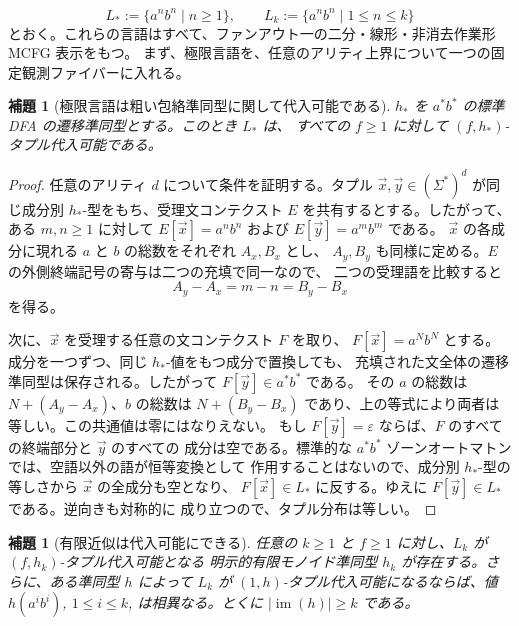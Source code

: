 \documentclass[11pt,a4paper]{ltjsarticle}
\newtheorem{lemma}[theorem]{補題}
\theoremstyle{remark}
\newcommand{\tuple}[1]{\vec{#1}}
\newcommand{\eps}{\varepsilon}
\begin{document}
\[
  L_*:=\{a^n b^n\mid n\ge1\},
  \qquad
  L_k:=\{a^n b^n\mid 1\le n\le k\}
\]
とおく。これらの言語はすべて、ファンアウト一の二分・線形・非消去作業形 MCFG 表示をもつ。
まず、極限言語を、任意のアリティ上界について一つの固定観測ファイバーに入れる。

\begin{lemma}[極限言語は粗い包絡準同型に関して代入可能である]
\label{lem:limit-ab-substitutable}
\(h_*\) を \(a^*b^*\) の標準 DFA の遷移準同型とする。このとき \(L_*\) は、
すべての \(f\ge1\) に対して \((f,h_*)\)-タプル代入可能である。
\end{lemma}

\begin{proof}
任意のアリティ \(d\) について条件を証明する。タプル
\(\tuple x,\tuple y\in(\Sigma^*)^d\) が同じ成分別 \(h_*\)-型をもち、受理文コンテクスト
\(E\) を共有するとする。したがって、ある \(m,n\ge1\) に対して
\(E[\tuple x]=a^n b^n\) および \(E[\tuple y]=a^m b^m\) である。
\(\tuple x\) の各成分に現れる \(a\) と \(b\) の総数をそれぞれ \(A_x,B_x\) とし、
\(A_y,B_y\) も同様に定める。\(E\) の外側終端記号の寄与は二つの充填で同一なので、
二つの受理語を比較すると
\[
  A_y-A_x=m-n=B_y-B_x
\]
を得る。

次に、\(\tuple x\) を受理する任意の文コンテクスト \(F\) を取り、
\(F[\tuple x]=a^N b^N\) とする。成分を一つずつ、同じ \(h_*\)-値をもつ成分で置換しても、
充填された文全体の遷移準同型は保存される。したがって \(F[\tuple y]\in a^*b^*\) である。
その \(a\) の総数は \(N+(A_y-A_x)\)、\(b\) の総数は
\(N+(B_y-B_x)\) であり、上の等式により両者は等しい。この共通値は零にはなりえない。
もし \(F[\tuple y]=\eps\) ならば、\(F\) のすべての終端部分と \(\tuple y\) のすべての
成分は空である。標準的な \(a^*b^*\) ゾーンオートマトンでは、空語以外の語が恒等変換として
作用することはないので、成分別 \(h_*\)-型の等しさから \(\tuple x\) の全成分も空となり、
\(F[\tuple x]\in L_*\) に反する。ゆえに \(F[\tuple y]\in L_*\) である。逆向きも対称的に
成り立つので、タプル分布は等しい。
\end{proof}

\begin{lemma}[有限近似は代入可能にできる]
\label{lem:finite-approximants-substitutable}
任意の \(k\ge1\) と \(f\ge1\) に対し、\(L_k\) が \((f,h_k)\)-タプル代入可能となる
明示的有限モノイド準同型 \(h_k\) が存在する。さらに、ある準同型 \(h\) によって \(L_k\) が
\((1,h)\)-タプル代入可能になるならば、値
\(h(a^i b^i)\), \(1\le i\le k\), は相異なる。とくに
\(|\operatorname{im}(h)|\ge k\) である。
\end{lemma}
\end{document}
